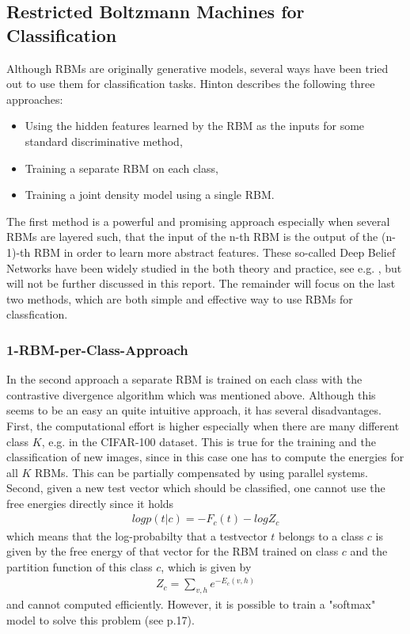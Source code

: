 \documentclass[a4paper]{scrartcl}
\begin{document}
\subsection{Restricted Boltzmann Machines for Classification}
Although RBMs are originally generative models, several ways have been tried out to use them for classification tasks. Hinton \cite{Hinton} describes the following three approaches:
\begin{itemize}
    \item Using the hidden features learned by the RBM as the inputs for some standard discriminative method,
    \item Training a separate RBM on each class,
	\item Training a joint density model using a single RBM.
\end{itemize}
The first method is a powerful and promising approach especially when several RBMs are layered such, that the input of the n-th RBM is the output of the (n-1)-th RBM in order to learn more abstract features. These so-called Deep Belief Networks have been widely studied in the both theory and practice, see e.g. \cite{DeepBelief}, but will not be further discussed in this report. The remainder will focus on the last two methods, which are both simple and effective way to use RBMs for classfication. 

\subsubsection{1-RBM-per-Class-Approach}
In the second approach a separate RBM is trained on each class with the contrastive divergence algorithm which was mentioned above. Although this seems to be an easy an quite intuitive approach, it has several disadvantages. First, the computational effort is higher especially when there are many different class $K$, e.g. in the CIFAR-100 dataset. This is true for the training and the classification of new images, since in this case one has to compute the energies for all $K$ RBMs. This can be partially compensated by using parallel systems. Second, given a new test vector which should be classified, one cannot use the free energies directly since it holds
\begin{align*}
log p(t|c) = -F_c(t) - log Z_c
\end{align*}
which means that the log-probabilty that a testvector $t$ belongs to a class $c$ is given by the free energy of that vector for the RBM trained on class $c$ and the partition function of this class $c$, which is given by
\begin{align}
Z_c = \sum_{v,h} e^{-E_c(v,h)}
\end{align}
and cannot computed efficiently. However, it is possible to train a "softmax" model to solve this problem (see \cite{Hinton} p.17).
\end{document}
